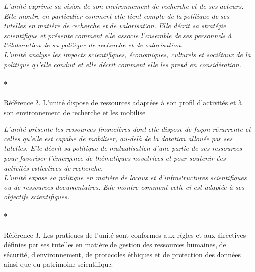 \documentclass[]{article}
\let\oldparagraph\paragraph
\renewcommand{\paragraph}[1]{\oldparagraph{#1}\mbox{}}
\newcommand{\instructions}[1]{{\em \color{hceresgreen}#1}}
\begin{document}
\instructions{L’unité exprime sa vision de son environnement de recherche et de ses acteurs. Elle montre en particulier comment elle tient compte de la politique de ses tutelles en matière de recherche et de valorisation. Elle décrit sa stratégie scientifique et présente comment elle associe l’ensemble de ses personnels à l’élaboration de sa politique de recherche et de valorisation.\\

L’unité analyse les impacts scientifiques, économiques, culturels et sociétaux de la politique qu’elle conduit et elle décrit comment elle les prend en considération.}

\paragraph*{Référence 2. L'unité dispose de ressources adaptées à son
profil d'activités et à son environnement de recherche et les mobilise.}

\instructions{L’unité présente les ressources financières dont elle dispose de façon récurrente et celles qu’elle est capable de mobiliser, au-delà de la dotation allouée par ses tutelles. Elle décrit sa politique de mutualisation d’une partie de ses ressources pour favoriser l’émergence de thématiques novatrices et pour soutenir des activités collectives de recherche.\\

L’unité expose sa politique en matière de locaux et d’infrastructures scientifiques ou de ressources documentaires. Elle montre comment celle-ci est adaptée à ses objectifs scientifiques.}

\paragraph*{Référence 3. Les pratiques de l'unité sont conformes aux
règles et aux directives définies par ses tutelles en matière de gestion
des ressources humaines, de sécurité, d'environnement, de protocoles
éthiques et de protection des données ainsi que du patrimoine
scientifique.}
\end{document}
